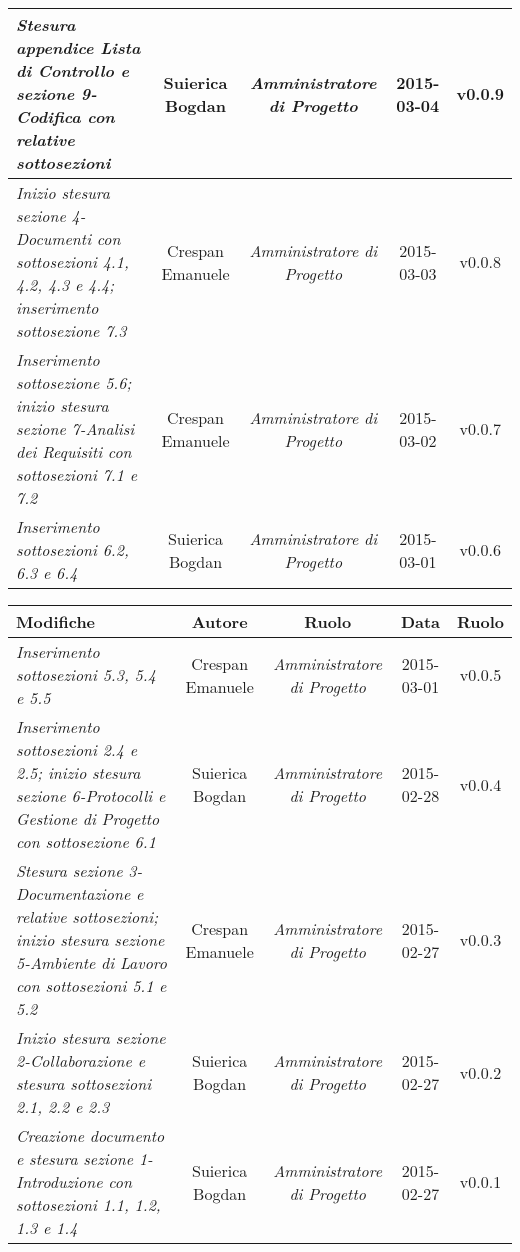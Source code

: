 \begin{table}[h]
\begin{tabular}{|p{}|c|c|c|c|}
    \midrule
	    \textit{Stesura appendice Lista di Controllo e sezione 9-Codifica con relative sottosezioni} & Suierica Bogdan & \textit{Amministratore di Progetto} & 2015-03-04 & v0.0.9 \\
	\midrule
		\textit{Inizio stesura sezione 4-Documenti con sottosezioni 4.1, 4.2, 4.3 e 4.4; inserimento sottosezione 7.3} & Crespan Emanuele & \textit{Amministratore di Progetto} & 2015-03-03 & v0.0.8 \\
	\midrule
		 \textit{Inserimento sottosezione 5.6; inizio stesura sezione 7-Analisi dei Requisiti con sottosezioni 7.1 e 7.2} & Crespan Emanuele & \textit{Amministratore di Progetto} & 2015-03-02 & v0.0.7 \\
	\midrule
		\textit{Inserimento sottosezioni 6.2, 6.3 e 6.4} & Suierica Bogdan & \textit{Amministratore di Progetto} & 2015-03-01 & v0.0.6 \\
	\bottomrule
\end{tabular}	
		
\newpage

\centering
\begin{tabular}{|p{}|c|c|c|c|}
	\toprule
	\textbf{Modifiche} & \textbf{Autore} & \textbf{Ruolo} & \textbf{Data} & \textbf{Ruolo} \\
	\midrule
	\midrule
		\textit{Inserimento sottosezioni 5.3, 5.4 e 5.5} & Crespan Emanuele & \textit{Amministratore di Progetto} & 2015-03-01 & v0.0.5 \\
	\midrule
		\textit{Inserimento sottosezioni 2.4 e 2.5; inizio stesura sezione 6-Protocolli e Gestione di Progetto con sottosezione 6.1} & Suierica Bogdan & \textit{Amministratore di Progetto} & 2015-02-28 & v0.0.4 \\
	\midrule
		\textit{Stesura sezione 3-Documentazione e relative sottosezioni; inizio stesura sezione 5-Ambiente di Lavoro con sottosezioni 5.1 e 5.2} & Crespan Emanuele & \textit{Amministratore di Progetto} & 2015-02-27 & v0.0.3 \\ 
	\midrule
		\textit{Inizio stesura sezione 2-Collaborazione e stesura sottosezioni 2.1, 2.2 e 2.3} & Suierica Bogdan & \textit{Amministratore di Progetto} & 2015-02-27 & v0.0.2 \\	                         
	\midrule
		\textit{Creazione documento e stesura sezione 1-Introduzione con sottosezioni 1.1, 1.2, 1.3 e 1.4} & Suierica Bogdan & \textit{Amministratore di Progetto} & 2015-02-27 & v0.0.1 \\
	\bottomrule
\end{tabular}	
\end{table}

\newpage